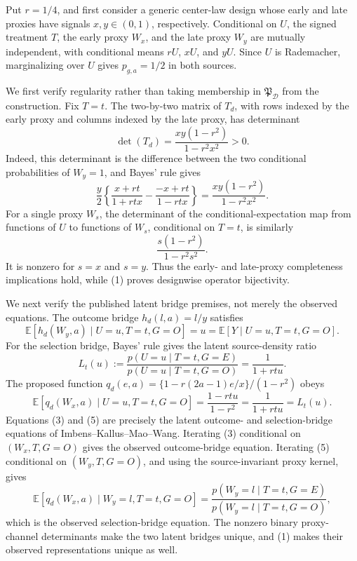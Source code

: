 Put \(r=1/4\), and first consider a generic center-law design whose early and late proxies have signals \(x,y\in(0,1)\), respectively.  Conditional on \(U\), the signed treatment \(T\), the early proxy \(W_x\), and the late proxy \(W_y\) are mutually independent, with conditional means \(rU\), \(xU\), and \(yU\).  Since \(U\) is Rademacher, marginalizing over \(U\) gives \(p_{g,a}=1/2\) in both sources.

We first verify regularity rather than taking membership in \(\mathfrak P_{\mathcal D}\) from the construction.  Fix \(T=t\).  The two-by-two matrix of \(T_d\), with rows indexed by the early proxy and columns indexed by the late proxy, has determinant
\[
 \det(T_d)=\frac{xy(1-r^2)}{1-r^2x^2}>0. \tag{1}
\]
Indeed, this determinant is the difference between the two conditional probabilities of \(W_y=1\), and Bayes' rule gives
\[
 \frac y2\left\{
 \frac{x+rt}{1+rtx}-\frac{-x+rt}{1-rtx}
 \right\}
 =\frac{xy(1-r^2)}{1-r^2x^2}.
\]
For a single proxy \(W_s\), the determinant of the conditional-expectation map from functions of \(U\) to functions of \(W_s\), conditional on \(T=t\), is similarly
\[
 \frac{s(1-r^2)}{1-r^2s^2}. \tag{2}
\]
It is nonzero for \(s=x\) and \(s=y\).  Thus the early- and late-proxy completeness implications hold, while (1) proves designwise operator bijectivity.

We next verify the published latent bridge premises, not merely the observed equations.  The outcome bridge \(h_d(l,a)=l/y\) satisfies
\[
 \mathbb E[h_d(W_y,a)\mid U=u,T=t,G=O]=u
 =\mathbb E[Y\mid U=u,T=t,G=O]. \tag{3}
\]
For the selection bridge, Bayes' rule gives the latent source-density ratio
\[
 L_t(u):=\frac{p(U=u\mid T=t,G=E)}{p(U=u\mid T=t,G=O)}
 =\frac1{1+rtu}. \tag{4}
\]
The proposed function \(q_d(e,a)=\{1-r(2a-1)e/x\}/(1-r^2)\) obeys
\[
 \mathbb E[q_d(W_x,a)\mid U=u,T=t,G=O]
 =\frac{1-rtu}{1-r^2}
 =\frac1{1+rtu}=L_t(u). \tag{5}
\]
Equations (3) and (5) are precisely the latent outcome- and selection-bridge equations of Imbens--Kallus--Mao--Wang.  Iterating (3) conditional on \((W_x,T,G=O)\) gives the observed outcome-bridge equation.  Iterating (5) conditional on \((W_y,T,G=O)\), and using the source-invariant proxy kernel, gives
\[
 \mathbb E[q_d(W_x,a)\mid W_y=l,T=t,G=O]
 =\frac{p(W_y=l\mid T=t,G=E)}{p(W_y=l\mid T=t,G=O)}, \tag{6}
\]
which is the observed selection-bridge equation.  The nonzero binary proxy-channel determinants make the two latent bridges unique, and (1) makes their observed representations unique as well.

